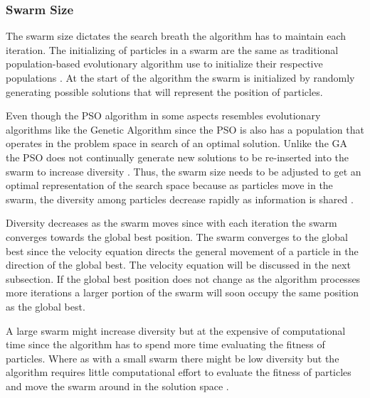 \subsubsection{Swarm Size}
The swarm size dictates the search breath the algorithm has to maintain each iteration\cite{FixedFAPPSO,CompuIntelligenceIntro}. The initializing of particles in a swarm are the same as traditional population-based evolutionary algorithm use to initialize their respective populations \cite{FixedFAPPSO}.  At the start of the algorithm the swarm is initialized by randomly generating possible solutions that will represent the position of particles\cite{CompuIntelligenceIntro}. 

Even though the PSO algorithm in some aspects resembles evolutionary algorithms like the Genetic Algorithm since the PSO is also has a population that operates in the problem space in search of an optimal solution. Unlike the GA the PSO does not continually generate new solutions to be re-inserted into the swarm to increase diversity \cite{PSOHybridUnitCommit}. Thus, the swarm size needs to be adjusted to get an optimal representation of the search space because as particles move in the swarm, the diversity among particles decrease rapidly as information is shared \cite{FundamentalSwarm,CompuIntelligenceIntro}. 

Diversity decreases as the swarm moves since with each iteration the swarm converges towards the global best position\cite{PSOHybridJobShop,CompuIntelligenceIntro,FundamentalSwarm}. The swarm converges to the global best since the velocity equation directs the general movement of a particle in the direction of the global best\cite{PSOHybridJobShop,CompuIntelligenceIntro,FundamentalSwarm}. The velocity equation will be discussed in the next subsection\cite{PSOHybridJobShop,CompuIntelligenceIntro,FundamentalSwarm}. If the global best position does not change as the algorithm processes more iterations a larger portion of the swarm will soon occupy the same position as the global best\cite{PSOHybridJobShop,CompuIntelligenceIntro,FundamentalSwarm}.

A large swarm might increase diversity but at the expensive of computational time since the algorithm has to spend more time evaluating the fitness of particles\cite{FundamentalSwarm,CompuIntelligenceIntro}. Where as with a small swarm there might be low diversity but the algorithm requires little computational effort to evaluate the fitness of particles and move the swarm around in the solution space \cite{FundamentalSwarm,CompuIntelligenceIntro}.

